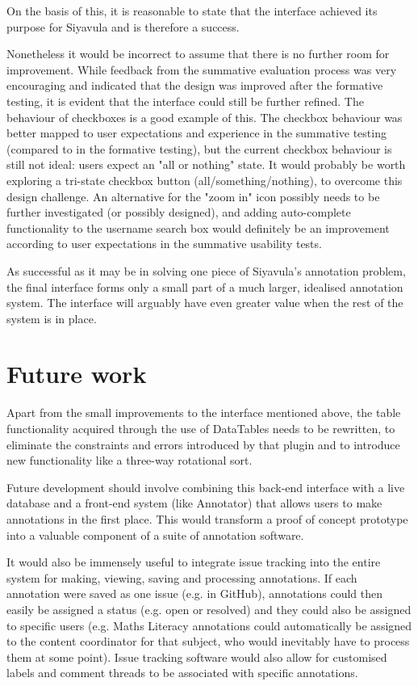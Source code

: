 On the basis of this, it is reasonable to state that the interface achieved its purpose for Siyavula and is therefore a success. 

Nonetheless it would be incorrect to assume that there is no further room for improvement. While feedback from the summative evaluation process was very encouraging and indicated that the design was improved after the formative testing, it is evident that the interface could still be further refined. The behaviour of checkboxes is a good example of this. The checkbox behaviour was better mapped to user expectations and experience in the summative testing (compared to in the formative testing), but the current checkbox behaviour is still not ideal: users expect an "all or nothing" state. It would probably be worth exploring a tri-state checkbox button (all/something/nothing), to overcome this design challenge. An alternative for the "zoom in" icon possibly needs to be further investigated (or possibly designed), and adding auto-complete functionality to the username search box would definitely be an improvement according to user expectations in the summative usability tests.

As successful as it may be in solving one piece of Siyavula's annotation problem, the final interface forms only a small part of a much larger, idealised annotation system. The interface will arguably have even greater value when the rest of the system is in place. 

\section{Future work}
Apart from the small improvements to the interface mentioned above, the table functionality acquired through the use of DataTables needs to be rewritten, to eliminate the constraints and errors introduced by that plugin and to introduce new functionality like a three-way rotational sort.

Future development should involve combining this back-end interface with a live database and a front-end system (like Annotator) that allows users to make annotations in the first place. This would transform a proof of concept prototype into a valuable component of a suite of annotation software.

It would also be immensely useful to integrate issue tracking into the entire system for making, viewing, saving and processing annotations. If each annotation were saved as one issue (e.g. in GitHub), annotations could then easily be assigned a status (e.g. open or resolved) and they could also be assigned to specific users (e.g. Maths Literacy annotations could automatically be assigned to the content coordinator for that subject, who would inevitably have to process them at some point). Issue tracking software would also allow for customised labels and comment threads to be associated with specific annotations. 

